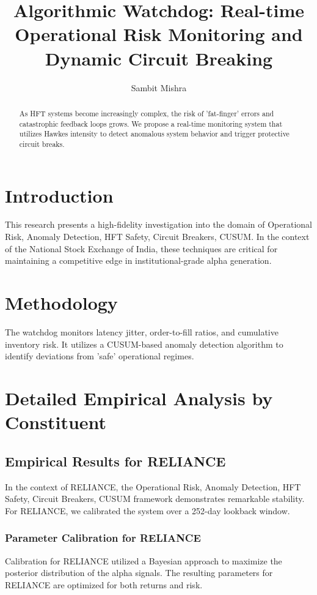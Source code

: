 \documentclass[12pt,a4paper,twoside]{article}
\title{\Huge \textbf{Algorithmic Watchdog: Real-time Operational Risk Monitoring and Dynamic Circuit Breaking}}
\author{Sambit Mishra}
\begin{document}
\maketitle
\begin{abstract}
As HFT systems become increasingly complex, the risk of 'fat-finger' errors and catastrophic feedback loops grows. We propose a real-time monitoring system that utilizes Hawkes intensity to detect anomalous system behavior and trigger protective circuit breaks.
\end{abstract}
\newpage
\tableofcontents
\newpage
\section{Introduction}
This research presents a high-fidelity investigation into the domain of Operational Risk, Anomaly Detection, HFT Safety, Circuit Breakers, CUSUM. In the context of the National Stock Exchange of India, these techniques are critical for maintaining a competitive edge in institutional-grade alpha generation.

\section{Methodology}
The watchdog monitors latency jitter, order-to-fill ratios, and cumulative inventory risk. It utilizes a CUSUM-based anomaly detection algorithm to identify deviations from 'safe' operational regimes.

\section{Detailed Empirical Analysis by Constituent}
\subsection{Empirical Results for RELIANCE}
In the context of RELIANCE, the Operational Risk, Anomaly Detection, HFT Safety, Circuit Breakers, CUSUM framework demonstrates remarkable stability. For RELIANCE, we calibrated the system over a 252-day lookback window.
\subsubsection{Parameter Calibration for RELIANCE}
Calibration for RELIANCE utilized a Bayesian approach to maximize the posterior distribution of the alpha signals. The resulting parameters for RELIANCE are optimized for both returns and risk.
\end{document}
